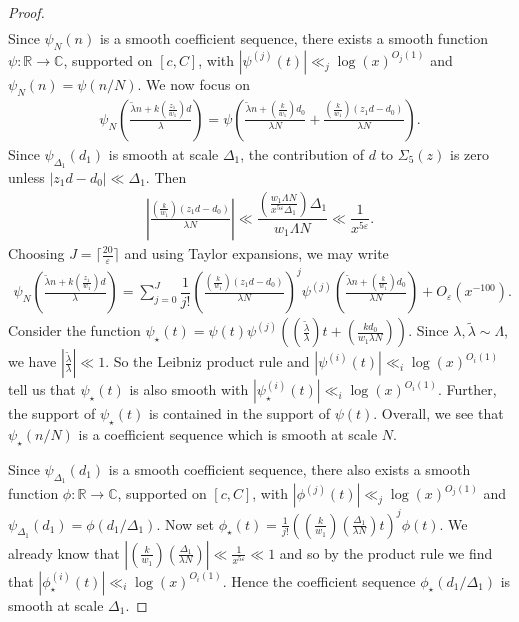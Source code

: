 \documentclass{amsart}
\numberwithin{equation}{section}
\begin{document}
\begin{proof}
\begin{align*}
\end{align*}
Since $\psi_N(n)$ is a smooth coefficient sequence, there exists a smooth function $\psi:\mathbb{R} \rightarrow \mathbb{C}$, supported on $[c,C]$, with $|\psi^{(j)}(t)|\ll_j \log(x)^{O_j(1)}$ and $\psi_N(n)=\psi(n/N)$. We now focus on 
\begin{align*}
\psi_N\!\left(\frac{\widetilde{\lambda} n +k(\frac{z_1}{w_1}) d}{\lambda}\right)= \psi\!\left(\frac{\widetilde{\lambda} n +(\frac{k}{w_1}) d_0}{\lambda N} + \frac{(\frac{k}{w_1})(z_1d-d_0)}{\lambda N}\right).
\end{align*}
Since $\psi_{\Delta_1}(d_1)$ is smooth at scale $\Delta_1$, the contribution of $d$ to $\Sigma_5(z)$ is zero unless $|z_1d-d_0|\ll \Delta_1$. Then
\begin{align*}
\left| \frac{(\frac{k}{w_1})(z_1d-d_0)}{\lambda N} \right| \ll \dfrac{\left(\frac{w_1 \Lambda N}{x^{5\varepsilon}\Delta_1}\right)\Delta_1}{w_1 \Lambda N} \ll \dfrac{1}{x^{5\varepsilon}}.
\end{align*}
Choosing $J= \lceil \frac{20}{\varepsilon} \rceil$ and using Taylor expansions, we may write 
\begin{align} \label{equ:taylorexpansion}
\psi_N\!\left(\frac{\widetilde{\lambda} n +k(\frac{z_1}{w_1}) d}{\lambda}\right)= \sum_{j=0}^J  \dfrac{1}{j!} \left( \frac{(\frac{k}{w_1})(z_1d-d_0)}{\lambda N}  \right)^j \psi^{(j)}\left(\frac{\widetilde{\lambda} n +(\frac{k}{w_1}) d_0}{\lambda N}  \right) + O_\varepsilon(x^{-100}).
\end{align}
Consider the function $\psi_\star(t) = \psi(t)\psi^{(j)}((\frac{\widetilde{\lambda}}{\lambda})t+(\frac{k d_0}{w_1 \lambda N} ))$.  Since $\lambda, \widetilde{\lambda} \sim \Lambda$, we have $|\frac{\widetilde{\lambda}}{\lambda}| \ll 1$.  So the Leibniz product rule and $|\psi^{(i)}(t)|\ll_i \log(x)^{O_i(1)}$ tell us that $\psi_\star(t)$ is also smooth with $|\psi_\star^{(i)}(t)|\ll_i \log(x)^{O_i(1)}$. Further, the support of $\psi_\star(t)$ is contained in the support of $\psi(t)$. Overall, we see that $\psi_\star(n/N)$ is a coefficient sequence which is smooth at scale $N$.

\vspace{3mm}
Since $\psi_{\Delta_1}(d_1)$ is a smooth coefficient sequence, there also exists a smooth function $\phi:\mathbb{R} \rightarrow \mathbb{C}$, supported on $[c,C]$, with $|\phi^{(j)}(t)|\ll_j \log(x)^{O_j(1)}$ and $\psi_{\Delta_1}(d_1)=\phi(d_1/\Delta_1)$.  Now set $\phi_\star(t) = \frac{1}{j!}((\frac{k}{w_1})(\frac{\Delta_1}{\lambda N}) t)^j \phi(t)$. We already know that $|(\frac{k}{w_1})(\frac{\Delta_1}{\lambda N}) | \ll \frac{1}{x^{5\varepsilon}} \ll 1$ and so by the product rule we find  that $|\phi_\star^{(i)}(t)|\ll_i \log(x)^{O_i(1)}$. Hence the coefficient sequence $\phi_\star(d_1/\Delta_1)$ is smooth at scale $\Delta_1$.


\end{proof}
\end{document}

